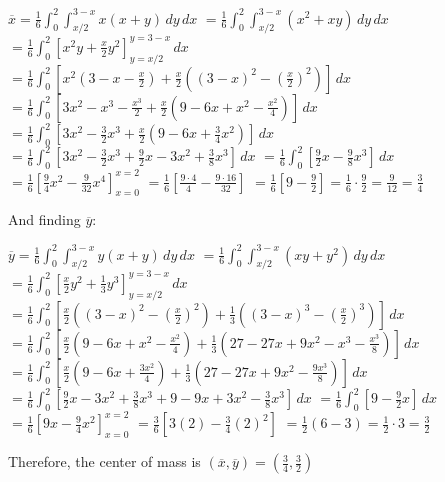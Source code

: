 \begin{Answer}[ref = c_of_m]
\begin{enumerate}
$\overline{x} = \frac{1}{6} \int_0^2 \int_{x/2}^{3 - x} x \left(x + y \right)
\,dy\,dx$
$= \frac{1}{6} \int_0^2 \int_{x/2}^{3 - x} \left(x^2 + xy \right)\,dy\,dx$
$= \frac{1}{6} \int_0^2 \left[ x^2y + \frac{x}{2}y^2 \right]_{y = x/2}^{y = 3 -
x}\,dx$
$= \frac{1}{6} \int_0^2 \left[ x^2\left( 3 - x - \frac{x}{2} \right) + \frac{x
}{2}\left( \left( 3 - x \right)^2 - \left( \frac{x}{2} \right)^2 \right) 
\right]\,dx$
$= \frac{1}{6} \int_0^2 \left[ 3x^2 - x^3 - \frac{x^3}{2} + \frac{x}{2} \left(
9 - 6x + x^2 - \frac{x^2}{4} \right) \right]\,dx$
$= \frac{1}{6} \int_0^2 \left[ 3x^2 - \frac{3}{2}x^3 + \frac{x}{2} \left( 9 - 
6x + \frac{3}{4}x^2 \right) \right]\,dx$
$= \frac{1}{6} \int_0^2 \left[ 3x^2 - \frac{3}{2}x^3 + \frac{9}{2}x - 3x^2 + 
\frac{3}{8}x^3 \right]\,dx$
$= \frac{1}{6} \int_0^2 \left[ \frac{9}{2}x - \frac{9}{8}x^3 \right]\,dx$
$= \frac{1}{6} \left[ \frac{9}{4}x^2 - \frac{9}{32}x^4 \right]_{x = 0}^{x = 2}$
$= \frac{1}{6} \left[ \frac{9 \cdot 4}{4} - \frac{9 \cdot 16}{32} \right]$
$= \frac{1}{6} \left[9 - \frac{9}{2} \right] = \frac{1}{6} \cdot \frac{9}{2} = 
\frac{9}{12} = \frac{3}{4}$

And finding $\overline{y}$:

$\overline{y} = \frac{1}{6} \int_0^2 \int_{x/2}^{3 - x} y \left(x + y \right)
\,dy\,dx$
$= \frac{1}{6} \int_0^2 \int_{x/2}^{3-x} \left(xy + y^2 \right)\,dy\,dx$
$= \frac{1}{6} \int_0^2 \left[ \frac{x}{2}y^2 + \frac{1}{3}y^3 \right]_{y = x/2
}^{y = 3 - x}\,dx$
$= \frac{1}{6} \int_0^2 \left[ \frac{x}{2} \left( \left( 3 - x \right)^2 - 
\left( \frac{x}{2} \right)^2 \right) + \frac{1}{3} \left( \left( 3 - x \right)^
3 - \left( \frac{x}{2} \right)^3 \right) \right]\,dx$
$= \frac{1}{6} \int_0^2 \left[ \frac{x}{2} \left( 9 - 6x + x^2 - \frac{x^2}{4} 
\right) + \frac{1}{3} \left( 27 - 27x +9x^2 - x^3 - \frac{x^3}{8} \right) 
\right]\,dx$
$= \frac{1}{6} \int_0^2 \left[ \frac{x}{2} \left( 9 - 6x + \frac{3x^2}{4} 
\right) + \frac{1}{3} \left( 27 - 27x + 9x^2 - \frac{9x^3}{8} \right) \right]
\,dx$
$= \frac{1}{6} \int_0^2 \left[ \frac{9}{2}x - 3x^2 + \frac{3}{8}x^3 + 9 - 9x + 
3x^2 - \frac{3}{8}x^3 \right]\,dx$
$= \frac{1}{6} \int_0^2 \left[ 9 - \frac{9}{2}x  \right]\,dx$
$= \frac{1}{6} \left[ 9x - \frac{9}{4}x^2 \right]_{x = 0}^{x = 2}$
$= \frac{3}{6} \left[3(2) - \frac{3}{4}(2)^2 \right]$
$= \frac{1}{2} \left(6 - 3 \right) = \frac{1}{2} \cdot 3 = \frac{3}{2}$

Therefore, the center of mass is $\left( \overline{x}, \overline{y} \right) = 
\left( \frac{3}{4}, \frac{3}{2} \right)$
\end{enumerate}

\end{Answer}

